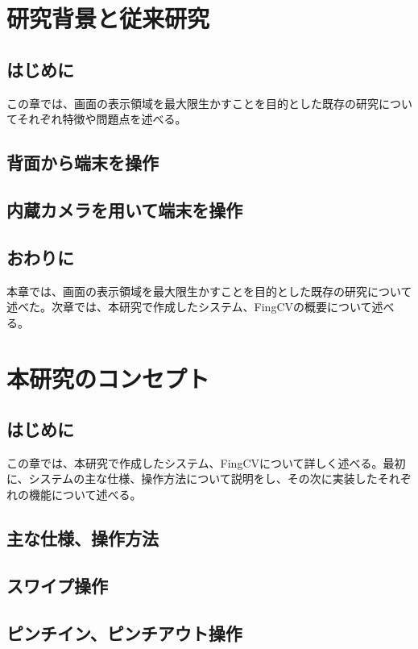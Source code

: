 \documentclass[11pt,a4j, titlepage]{jarticle} %
\begin{document}
\newpage
\section{研究背景と従来研究}
\subsection{はじめに}
この章では、画面の表示領域を最大限生かすことを目的とした既存の研究についてそれぞれ特徴や問題点を述べる。

\subsection{背面から端末を操作}


\subsection{内蔵カメラを用いて端末を操作}


\subsection{おわりに}
本章では、画面の表示領域を最大限生かすことを目的とした既存の研究について述べた。次章では、本研究で作成したシステム、FingCVの概要について述べる。

\newpage
\section{本研究のコンセプト}
\subsection{はじめに}
この章では、本研究で作成したシステム、FingCVについて詳しく述べる。最初に、システムの主な仕様、操作方法について説明をし、その次に実装したそれぞれの機能について述べる。
\subsection{主な仕様、操作方法}



\subsection{スワイプ操作}


\subsection{ピンチイン、ピンチアウト操作}
\end{document}

